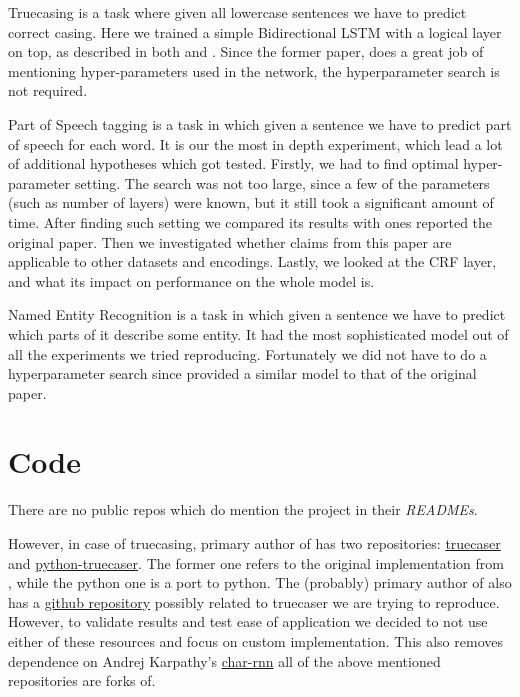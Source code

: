 \documentclass[11pt,a4paper]{article}
\begin{document}
Truecasing is a task where given all lowercase sentences we have to predict correct casing. Here we trained a simple Bidirectional LSTM with a logical layer on top, as described in both \cite{ner-and-pos-original} and \cite{susanto-etal-2016-learning}. Since the former paper, does a great job of mentioning hyper-parameters used in the network, the hyperparameter search is not required.

Part of Speech tagging is a task in which given a sentence we have to predict part of speech for each word. It is our the most in depth experiment, which lead a lot of additional hypotheses which got tested. Firstly, we had to find optimal hyper-parameter setting. The search was not too large, since a few of the parameters (such as number of layers) were known, but it still took a significant amount of time. After finding such setting we compared its results with ones reported the original paper. Then we investigated whether claims from this paper are applicable to other datasets and encodings. Lastly, we looked at the CRF layer, and what its impact on performance on the whole model is.

Named Entity Recognition is a task in which given a sentence we have to predict which parts of it describe some entity. It had the most sophisticated model out of all the experiments we tried reproducing. Fortunately we did not have to do a hyperparameter search since \cite{DBLP:journals/corr/LampleBSKD16} provided a similar model to that of the original paper.

\section{Code}
There are no public repos which do mention the project in their \textit{READMEs}.

However, in case of truecasing, primary author of \cite{ner-and-pos-original} has two repositories: \href{https://github.com/mayhewsw/truecaser}{truecaser} and \href{https://github.com/mayhewsw/pytorch-truecaser}{python-truecaser}. The former one refers to the original implementation from \cite{susanto-etal-2016-learning}, while the python one is a port to python. The (probably) primary author of \cite{susanto-etal-2016-learning} also has a \href{https://github.com/raymondhs/char-rnn-truecase}{github repository} possibly related to truecaser we are trying to reproduce. However, to validate results and test ease of application we decided to not use either of these resources and focus on custom implementation. This also removes dependence on Andrej Karpathy's \href{https://github.com/karpathy/char-rnn}{char-rnn} all of the above mentioned repositories are forks of.
\end{document}
